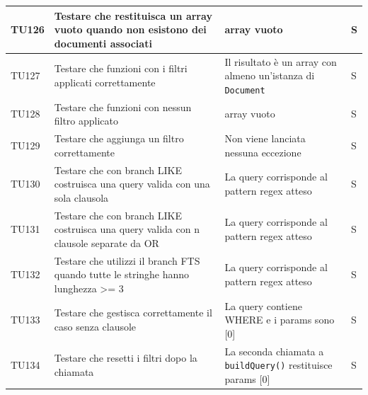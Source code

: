 \documentclass[a4paper,12pt]{article}
\begin{document}
\begin{longtable}{|M{1.2cm}|M{5cm}|M{8cm}|M{1.5cm}|}
            TU126 & Testare che \texttt{} restituisca un array vuoto quando non esistono dei documenti associati & array vuoto & S \\
            \hline

            TU127 & Testare che \texttt{} funzioni con i filtri applicati correttamente & Il risultato è un array con almeno un'istanza di \texttt{Document} & S \\
            \hline

            TU128 & Testare che \texttt{} funzioni con nessun filtro applicato & array vuoto & S \\
            \hline

            TU129 & Testare che \texttt{} aggiunga un filtro correttamente & Non viene lanciata nessuna eccezione & S \\
            \hline

            TU130 & Testare che \texttt{} con branch LIKE costruisca una query valida con una sola clausola & La query corrisponde al pattern regex atteso & S \\
            \hline

            TU131 & Testare che \texttt{} con branch LIKE costruisca una query valida con n clausole separate da OR & La query corrisponde al pattern regex atteso & S \\
            \hline

            TU132 & Testare che \texttt{} utilizzi il branch FTS quando tutte le stringhe hanno lunghezza >= 3 & La query corrisponde al pattern regex atteso & S \\
            \hline

            TU133 & Testare che \texttt{} gestisca correttamente il caso senza clausole & La query contiene WHERE e i params sono [0] & S \\
            \hline

            TU134 & Testare che \texttt{} resetti i filtri dopo la chiamata & La seconda chiamata a \texttt{buildQuery()} restituisce params [0] & S \\
            \hline


\end{longtable}
\end{document}
